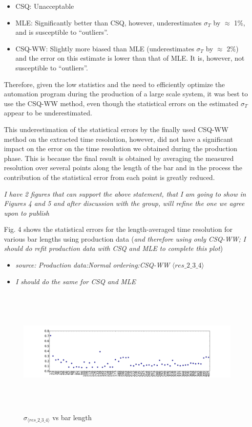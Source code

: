 \documentclass[12pt]{article}
\begin{document}
\begin{itemize}
	\item CSQ: Unacceptable
	\item MLE: Significantly better than CSQ, however, underestimates $\sigma_{T}$ by $\approx$ 1\%, and is susceptible to ``outliers''.
	\item CSQ-WW: Slightly more biased than MLE (underestimates $\sigma_{T}$ by $\approx$ 2\%) and the error on this estimate is lower than that of MLE. It is, however, not susceptible to ``outliers''.
\end{itemize}

Therefore, given the low statistics and the need to efficiently optimize the automation program during the production of a large scale system, it was best to use the CSQ-WW method, even though the statistical errors on the estimated $\sigma_{T}$ appear to be underestimated. 

This underestimation of the statistical errors by the finally used CSQ-WW method on the extracted time resolution, however, did not have a significant impact on the error on the time resolution we obtained during the production phase. This is because the final result is obtained by averaging the measured resolution over several points along the length of the bar and in the process the contribution of the statistical error from each point is greatly reduced. 

\textit{I have 2 figures that can support the above statement, that I am going to show in Figures 4 and 5 and after discussion with the group, will refine the one we agree upon to publish}

Fig. 4 shows the statistical errors for the length-averaged time resolution for various bar lengths using production data (\textit{and therefore using only CSQ-WW; I should do refit production data with CSQ and MLE to complete this plot})
\begin{itemize}
 	\item \textit{source: Production data:Normal ordering:CSQ-WW $\langle res\_2\_3\_4 \rangle$}
 	\item \textit{I should do the same for CSQ and MLE}
 \end{itemize}

\begin{figure}[ht]
	\includegraphics[height=2.5in,width=5.5in]{err_res_2_3_4_pointXX_cont.pdf}
	\caption{$\sigma_{\langle res\_2\_3\_4 \rangle}$ vs bar length}
	\label{fig4}
\end{figure}
\end{document}
